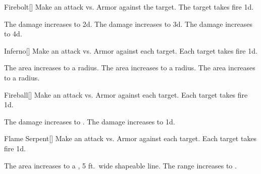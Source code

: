 \lowercase{\hypertarget{spell:Firebolt}{}}\label{spell:Firebolt}
\begin{freeability}[Rank 1]{\hypertarget{spell:Firebolt}{Firebolt}}[]
Make an attack vs. Armor against the target.
\hit The target takes fire  \plus1d.

\rankline
{} The damage increases to  \plus2d.
 The damage increases to  \plus3d.
 The damage increases to  \plus4d.
\end{freeability}
\vspace{0.25em}



\lowercase{\hypertarget{spell:Inferno}{}}\label{spell:Inferno}
\begin{freeability}[Rank 1]{\hypertarget{spell:Inferno}{Inferno}}[]
Make an attack vs. Armor against each target.
\hit Each target takes fire  \minus1d.

\rankline
{} The area increases to a \arealarge radius.
 The area increases to a \areahuge radius.
 The area increases to a \areaext radius.
\end{freeability}
\vspace{0.25em}



\lowercase{\hypertarget{spell:Fireball}{}}\label{spell:Fireball}
\begin{freeability}[Rank 3]{\hypertarget{spell:Fireball}{Fireball}}[]
Make an attack vs. Armor against each target.
\hit Each target takes fire  \minus1d.

\rankline
{} The damage increases to .
 The damage increases to  \plus1d.
\end{freeability}
\vspace{0.25em}



\lowercase{\hypertarget{spell:Flame Serpent}{}}\label{spell:Flame Serpent}
\begin{freeability}[Rank 3]{\hypertarget{spell:Flame Serpent}{Flame Serpent}}[]
Make an attack vs. Armor against each target.
\hit Each target takes fire  \minus1d.

\rankline
{} The area increases to a \arealarge, 5 ft.\ wide shapeable line.
 The range increases to \rnglong.
\end{freeability}
\vspace{0.25em}



